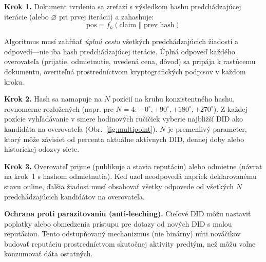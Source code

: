\documentclass[11pt,a4paper,twocolumn]{article}
\begin{document}
\textbf{Krok 1.} Dokument tvrdenia sa zreťazí s výsledkom hashu predchádzajúcej iterácie (alebo $\varnothing$ pri prvej iterácii) a zahashuje:
\begin{equation}
\text{pos} = f_h(\text{claim} \| \text{prev\_hash})
\label{eq:hash}
\end{equation}

Algoritmus musí zahŕňať \emph{úplnú cestu} všetkých predchádzajúcich žiadostí a odpovedí---nie iba hash predchádzajúcej iterácie. Úplná odpoveď každého overovateľa (prijatie, odmietnutie, uvedená cena, dôvod) sa pripája k rastúcemu dokumentu, overiteľná prostredníctvom kryptografických podpisov v každom kroku.

\textbf{Krok 2.} Hash sa namapuje na $N$ pozícií na kruhu konzistentného hashu, rovnomerne rozložených (napr. pre $N=4$: $+0^{\circ}, +90^{\circ}, +180^{\circ}, +270^{\circ}$). Z každej pozície vyhľadávanie v smere hodinových ručičiek vyberie najbližší DID ako kandidáta na overovateľa (Obr.~\ref{fig:multipoint}). $N$ je premenlivý parameter, ktorý môže závisieť od percenta aktuálne aktívnych DID, dennej doby alebo historickej odozvy siete.

\textbf{Krok 3.} Overovateľ prijme (publikuje a stavia reputáciu) alebo odmietne (návrat na krok~1 s hashom odmietnutia). Keď uzol neodpovedá napriek deklarovanému stavu online, ďalšia žiadosť musí obsahovať všetky odpovede od všetkých $N$ predchádzajúcich kandidátov na overovateľa.

\textbf{Ochrana proti parazitovaniu (anti-leeching).} Cieľové DID môžu nastaviť poplatky alebo obmedzenia prístupu pre dotazy od nových DID s malou reputáciou. Tento odstupňovaný mechanizmus (nie binárny) núti nováčikov budovať reputáciu prostredníctvom skutočnej aktivity predtým, než môžu voľne konzumovať dáta ostatných.
\end{document}
